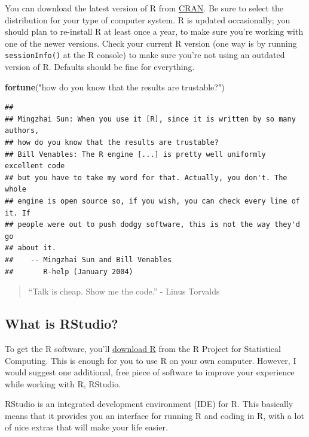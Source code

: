 \documentclass[]{book}
\makeatletter
\newenvironment{Shaded}{\begin{snugshade}}{\end{snugshade}}
\newcommand{\KeywordTok}[1]{\textcolor[rgb]{0.13,0.29,0.53}{\textbf{#1}}}
\newcommand{\StringTok}[1]{\textcolor[rgb]{0.31,0.60,0.02}{#1}}
\newcommand{\NormalTok}[1]{#1}
\newenvironment{kframe}{%
\medskip{}
\setlength{\fboxsep}{.8em}
 \def\at@end@of@kframe{}%
 \ifinner\ifhmode%
  \def\at@end@of@kframe{\end{minipage}}%
  \begin{minipage}{\columnwidth}%
 \fi\fi%
 \def\FrameCommand##1{\hskip\@totalleftmargin \hskip-\fboxsep
 \colorbox{shadecolor}{##1}\hskip-\fboxsep
     \hskip-\linewidth \hskip-\@totalleftmargin \hskip\columnwidth}%
 \MakeFramed {\advance\hsize-\width
   \@totalleftmargin\z@ \linewidth\hsize
   \@setminipage}}%
 {\par\unskip\endMakeFramed%
 \at@end@of@kframe}
\renewenvironment{Shaded}{\begin{kframe}}{\end{kframe}}
\theoremstyle{definition}
\theoremstyle{definition}
\theoremstyle{definition}
\theoremstyle{remark}
\makeatother
\begin{document}
You can download the latest version of R from
\href{https://cran.r-project.org}{CRAN}. Be sure to select the
distribution for your type of computer system. R is updated
occasionally; you should plan to re-install R at least once a year, to
make sure you're working with one of the newer versions. Check your
current R version (one way is by running \texttt{sessionInfo()} at the R
console) to make sure you're not using an outdated version of R.
Defaults should be fine for everything.

\begin{Shaded}
\begin{Highlighting}[]
\KeywordTok{fortune}\NormalTok{(}\StringTok{"how do you know that the results are trustable?"}\NormalTok{)}
\end{Highlighting}
\end{Shaded}

\begin{verbatim}
## 
## Mingzhai Sun: When you use it [R], since it is written by so many authors,
## how do you know that the results are trustable?
## Bill Venables: The R engine [...] is pretty well uniformly excellent code
## but you have to take my word for that. Actually, you don't. The whole
## engine is open source so, if you wish, you can check every line of it. If
## people were out to push dodgy software, this is not the way they'd go
## about it.
##    -- Mingzhai Sun and Bill Venables
##       R-help (January 2004)
\end{verbatim}

\begin{quote}
``Talk is cheap. Show me the code.'' - Linus Torvalds
\end{quote}

\subsection{What is RStudio?}\label{what-is-rstudio}

To get the R software, you'll \href{https://www.r-project.org}{download
R} from the R Project for Statistical Computing. This is enough for you
to use R on your own computer. However, I would suggest one additional,
free piece of software to improve your experience while working with R,
RStudio.

RStudio is an integrated development environment (IDE) for R. This
basically means that it provides you an interface for running R and
coding in R, with a lot of nice extras that will make your life easier.
\end{document}
